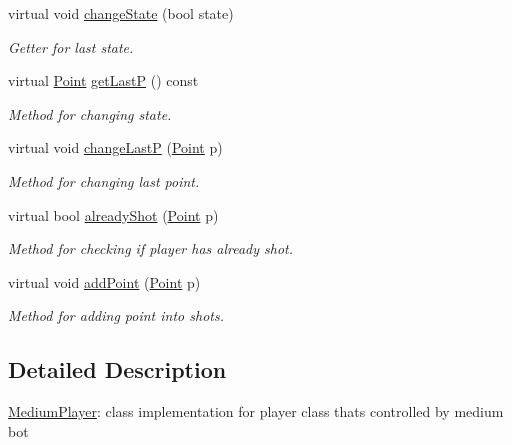 \begin{DoxyCompactItemize}
\mbox{\label{class_medium_player_ae0f69d678d6567e09baed0350468be61}} 
virtual void \mbox{\hyperlink{class_medium_player_ae0f69d678d6567e09baed0350468be61}{change\+State}} (bool state)
\begin{DoxyCompactList}\small\item\em Getter for last state. \end{DoxyCompactList}\item 
\mbox{\label{class_medium_player_abd585986250a5b713d6a554ea70e3ba6}} 
virtual \mbox{\hyperlink{class_point}{Point}} \mbox{\hyperlink{class_medium_player_abd585986250a5b713d6a554ea70e3ba6}{get\+LastP}} () const
\begin{DoxyCompactList}\small\item\em Method for changing state. \end{DoxyCompactList}\item 
virtual void \mbox{\hyperlink{class_medium_player_afc952f7dac91d979743154c021d8dee8}{change\+LastP}} (\mbox{\hyperlink{class_point}{Point}} p)
\begin{DoxyCompactList}\small\item\em Method for changing last point. \end{DoxyCompactList}\item 
virtual bool \mbox{\hyperlink{class_medium_player_a0c237af510ff84898759ed2e9a9271ce}{already\+Shot}} (\mbox{\hyperlink{class_point}{Point}} p)
\begin{DoxyCompactList}\small\item\em Method for checking if player has already shot. \end{DoxyCompactList}\item 
virtual void \mbox{\hyperlink{class_medium_player_a4cd5cbf0327e002112c80a52b279358f}{add\+Point}} (\mbox{\hyperlink{class_point}{Point}} p)
\begin{DoxyCompactList}\small\item\em Method for adding point into shots. \end{DoxyCompactList}\end{DoxyCompactItemize}


\subsection{Detailed Description}
\mbox{\hyperlink{class_medium_player}{Medium\+Player}}\+: class implementation for player class that\textquotesingle{}s controlled by medium bot 

